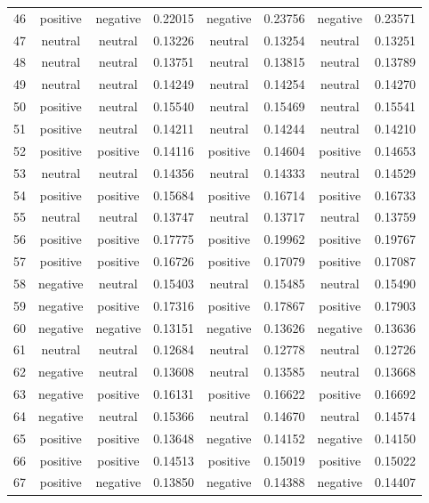 \begin{center}
\begin{footnotesize}
\begin{longtable}{cc | cc | cc | cc}
46 & positive & negative & 0.22015 & negative & 0.23756 & negative & 0.23571 \\
47 & neutral & neutral & 0.13226 & neutral & 0.13254 & neutral & 0.13251 \\
48 & neutral & neutral & 0.13751 & neutral & 0.13815 & neutral & 0.13789 \\
49 & neutral & neutral & 0.14249 & neutral & 0.14254 & neutral & 0.14270 \\
50 & positive & neutral & 0.15540 & neutral & 0.15469 & neutral & 0.15541 \\
51 & positive & neutral & 0.14211 & neutral & 0.14244 & neutral & 0.14210 \\
52 & positive & positive & 0.14116 & positive & 0.14604 & positive & 0.14653 \\
53 & neutral & neutral & 0.14356 & neutral & 0.14333 & neutral & 0.14529 \\
54 & positive & positive & 0.15684 & positive & 0.16714 & positive & 0.16733 \\
55 & neutral & neutral & 0.13747 & neutral & 0.13717 & neutral & 0.13759 \\
56 & positive & positive & 0.17775 & positive & 0.19962 & positive & 0.19767 \\
57 & positive & positive & 0.16726 & positive & 0.17079 & positive & 0.17087 \\
58 & negative & neutral & 0.15403 & neutral & 0.15485 & neutral & 0.15490 \\
59 & negative & positive & 0.17316 & positive & 0.17867 & positive & 0.17903 \\
60 & negative & negative & 0.13151 & negative & 0.13626 & negative & 0.13636 \\
61 & neutral & neutral & 0.12684 & neutral & 0.12778 & neutral & 0.12726 \\
62 & negative & neutral & 0.13608 & neutral & 0.13585 & neutral & 0.13668 \\
63 & negative & positive & 0.16131 & positive & 0.16622 & positive & 0.16692 \\
64 & negative & neutral & 0.15366 & neutral & 0.14670 & neutral & 0.14574 \\
65 & positive & positive & 0.13648 & negative & 0.14152 & negative & 0.14150 \\
66 & positive & positive & 0.14513 & positive & 0.15019 & positive & 0.15022 \\
67 & positive & negative & 0.13850 & negative & 0.14388 & negative & 0.14407 \\

\end{longtable}
\end{footnotesize}
\end{center}
